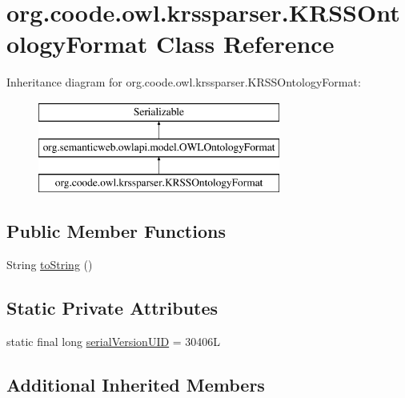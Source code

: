 \hypertarget{classorg_1_1coode_1_1owl_1_1krssparser_1_1_k_r_s_s_ontology_format}{\section{org.\-coode.\-owl.\-krssparser.\-K\-R\-S\-S\-Ontology\-Format Class Reference}
\label{classorg_1_1coode_1_1owl_1_1krssparser_1_1_k_r_s_s_ontology_format}
}
Inheritance diagram for org.\-coode.\-owl.\-krssparser.\-K\-R\-S\-S\-Ontology\-Format\-:\begin{figure}[H]
\begin{center}
\leavevmode
\includegraphics[height=3.000000cm]{classorg_1_1coode_1_1owl_1_1krssparser_1_1_k_r_s_s_ontology_format}
\end{center}
\end{figure}
\subsection*{Public Member Functions}
\begin{DoxyCompactItemize}
\item 
String \hyperlink{classorg_1_1coode_1_1owl_1_1krssparser_1_1_k_r_s_s_ontology_format_a92b29224a701717af0502fb5a74a0924}{to\-String} ()
\end{DoxyCompactItemize}
\subsection*{Static Private Attributes}
\begin{DoxyCompactItemize}
\item 
static final long \hyperlink{classorg_1_1coode_1_1owl_1_1krssparser_1_1_k_r_s_s_ontology_format_aa853181cd08fc40555b824c1773a2505}{serial\-Version\-U\-I\-D} = 30406\-L
\end{DoxyCompactItemize}
\subsection*{Additional Inherited Members}


